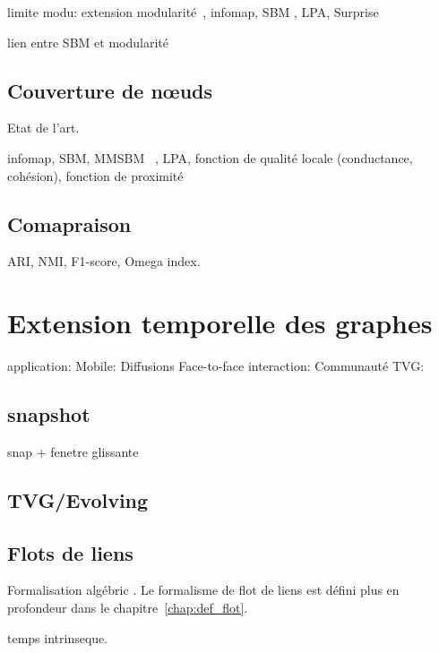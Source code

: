 limite modu: \cite{Fortunato2007} extension \cite{Reichardt2006, Delvenne2010}
modularité~\cite{Newman2004}, infomap, SBM \cite{Holland1983a}, LPA, Surprise

lien entre SBM et modularité\cite{Newman2016}
\subsection{Couverture de n\oe uds}
\label{subsec:cover}
Etat de l'art.
\cite{Danisch2012, Kanawati2014, Xie2013,Bandyopadhyay2015}

infomap, SBM, MMSBM~\cite{Ball2011,Airoldi2008} , LPA, fonction de qualité locale (conductance, cohésion), fonction de proximité


\subsection{Comapraison}
ARI, NMI, F1-score, Omega index.


\section{Extension temporelle des graphes}
\label{sec:intro_extension_temporelle}

application:
Mobile: \cite{Aledavood2015}
Diffusions \cite{Backlund2014}
Face-to-face interaction: \cite{Barrat2013,Asur2009}
Communauté TVG: \cite{Bassett2013,Bazzi2014}
\subsection{snapshot}
snap\cite{Asur2009,Bassett2013,Bazzi2014} + fenetre glissante
\subsection{TVG/Evolving}
\cite{Casteigts2011}
\subsection{Flots de liens}
Formalisation algébric \cite{Batagelj2015}.
Le formalisme de flot de liens est défini plus en profondeur dans le chapitre~\ref{chap:def_flot}.

temps intrinseque.
\cite{Albano2006}